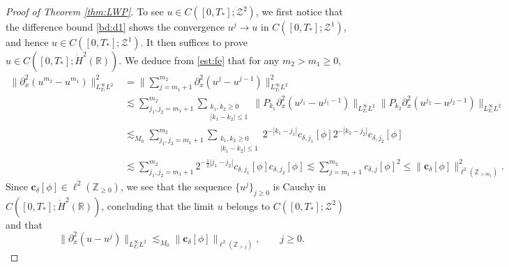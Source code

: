 \documentclass{amsart}
\numberwithin{equation}{section}
\newcommand{\R}{\mathbb{R}}
\newcommand{\Z}{\mathbb{Z}}
\begin{document}
\begin{proof}[Proof of Theorem \ref{thm:LWP}]
To see $u\in C([0,T_*];\mathcal{Z}^2)$, we first notice that the difference bound \eqref{bd:d1} shows the convergence $u^j\to u$ in $C([0,T_*];\mathcal{Z}^1)$, and hence $u\in C([0,T_*];\mathcal{Z}^1)$.
It then suffices to prove $u\in C([0,T_*];\dot{H}^2(\R))$.
We deduce from \eqref{est:fe} that for any $m_2>m_1\geq 0$,
\begin{align*}
\| \partial_x^2(u^{m_2}-u^{m_1})\|_{L^\infty_{T_*}L^2}^2&=\bigg\| \sum_{j=m_1+1}^{m_2}\partial_x^2(u^j-u^{j-1})\bigg\|_{L^\infty_{T_*}L^2}^2 \\
&\lesssim \sum_{j_1,j_2=m_1+1}^{m_2}\sum_{\begin{smallmatrix} k_1,k_2\geq 0 \\ |k_1-k_2|\leq 1\end{smallmatrix}}\| P_{k_1}\partial_x^2(u^{j_1}-u^{j_1-1})\|_{L^\infty_{T_*}L^2}\| P_{k_2}\partial_x^2(u^{j_2}-u^{j_2-1})\|_{L^\infty_{T_*}L^2} \\
&\lesssim_{M_0} \sum_{j_1,j_2=m_1+1}^{m_2}\sum_{\begin{smallmatrix} k_1,k_2\geq 0 \\ |k_1-k_2|\leq 1\end{smallmatrix}}2^{-|k_1-j_1|}c_{\delta,j_1}[\phi] 2^{-|k_2-j_2|}c_{\delta,j_2}[\phi] \\
&\lesssim \sum_{j_1,j_2=m_1+1}^{m_2} 2^{-\frac12|j_1-j_2|}c_{\delta,j_1}[\phi]c_{\delta,j_2}[\phi] \lesssim \sum_{j=m_1+1}^{m_2}c_{\delta,j}[\phi]^2
\leq \| \mathbf{c}_\delta[\phi]\|_{\ell^2(\mathbb{Z}_{>m_1})}^2.
\end{align*}
Since $\mathbf{c}_\delta[\phi]\in \ell^2(\Z_{\geq 0})$, we see that the sequence $\{ u^j\}_{j\geq 0}$ is Cauchy in $C([0,T_*];\dot{H}^2(\R))$, concluding that the limit $u$ belongs to $C([0,T_*];\mathcal{Z}^2)$ and that
\begin{equation}\label{est:cont1}
\| \partial_x^2(u-u^j)\|_{L^\infty_{T_*}L^2}\lesssim_{M_0} \| \mathbf{c}_\delta[\phi]\|_{\ell^2(\Z_{>j})},\qquad j\geq 0.
\end{equation}


\end{proof}
\end{document}
